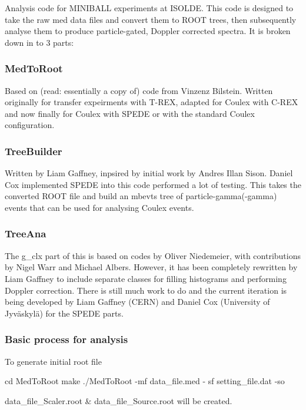 Analysis code for M\+I\+N\+I\+B\+A\+LL experiments at I\+S\+O\+L\+DE. This code is designed to take the raw med data files and convert them to R\+O\+OT trees, then subsequently analyse them to produce particle-\/gated, Doppler corrected spectra. It is broken down in to 3 parts\+:

\subsubsection*{Med\+To\+Root}

Based on (read\+: essentially a copy of) code from Vinzenz Bilstein. Written originally for transfer expeirments with T-\/\+R\+EX, adapted for Coulex with C-\/\+R\+EX and now finally for Coulex with S\+P\+E\+DE or with the standard Coulex configuration.

\subsubsection*{Tree\+Builder}

Written by Liam Gaffney, inpsired by initial work by Andres Illan Sison. Daniel Cox implemented S\+P\+E\+DE into this code performed a lot of testing. This takes the converted R\+O\+OT file and build an \textquotesingle{}mbevts\textquotesingle{} tree of particle-\/gamma(-\/gamma) events that can be used for analysing Coulex events.

\subsubsection*{Tree\+Ana}

The g\+\_\+clx part of this is based on codes by Oliver Niedemeier, with contributions by Nigel Warr and Michael Albers. However, it has been completely rewritten by Liam Gaffney to include separate classes for filling histograms and performing Doppler correction. There is still much work to do and the current iteration is being developed by Liam Gaffney (C\+E\+RN) and Daniel Cox (University of Jyväskylä) for the S\+P\+E\+DE parts.

\subsubsection*{Basic process for analysis}

To generate initial root file 
\begin{DoxyCode}
cd MedToRoot
make
./MedToRoot -mf data\_file.med - sf setting\_file.dat -so
\end{DoxyCode}
 data\+\_\+file\+\_\+\+Scaler.\+root \& data\+\_\+file\+\_\+\+Source.\+root will be created.

